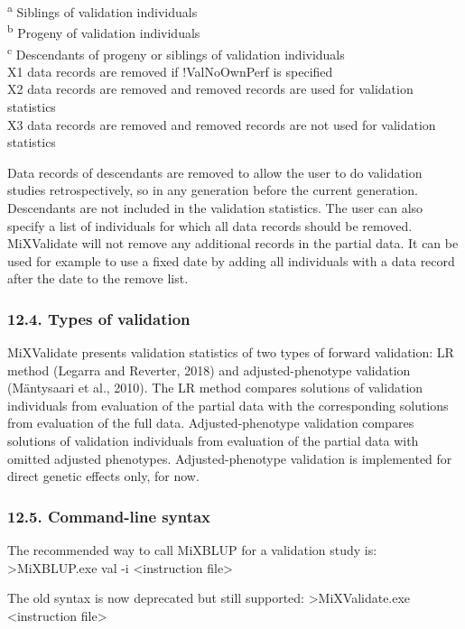 \textsuperscript{a} Siblings of validation individuals\\
\textsuperscript{b} Progeny of validation individuals\\
\textsuperscript{c} Descendants of progeny or siblings of validation
individuals\\
X1 data records are removed if !ValNoOwnPerf is specified\\
X2 data records are removed and removed records are used for validation
statistics\\
X3 data records are removed and removed records are not used for
validation statistics

Data records of descendants are removed to allow the user to do
validation studies retrospectively, so in any generation before the
current generation. Descendants are not included in the validation
statistics. The user can also specify a list of individuals for which
all data records should be removed. MiXValidate will not remove any
additional records in the partial data. It can be used for example to
use a fixed date by adding all individuals with a data record after the
date to the remove list.

\subsubsection{12.4. Types of validation}\label{Vali06}

MiXValidate presents validation statistics of two types of forward
validation: LR method (Legarra and Reverter, 2018) and
adjusted-phenotype validation (Mäntysaari et al., 2010). The LR method
compares solutions of validation individuals from evaluation of the
partial data with the corresponding solutions from evaluation of the
full data. Adjusted-phenotype validation compares solutions of
validation individuals from evaluation of the partial data with omitted
adjusted phenotypes. Adjusted-phenotype validation is implemented for
direct genetic effects only, for now.

\subsubsection{12.5. Command-line syntax}\label{Vali07}

The recommended way to call MiXBLUP for a validation study is:
\textgreater MiXBLUP.exe val -i \textless instruction file\textgreater{}

The old syntax is now deprecated but still supported:
\textgreater MiXValidate.exe \textless instruction file\textgreater{}

